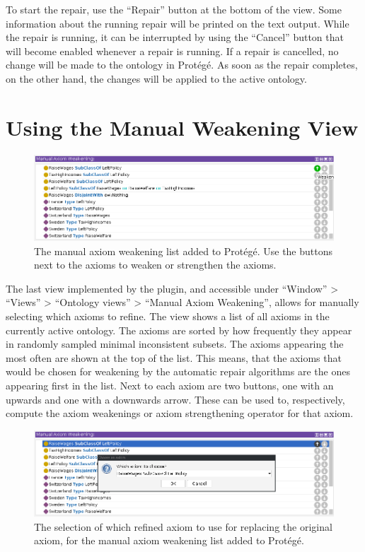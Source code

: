 To start the repair, use the ``Repair'' button at the bottom of the view. Some information about the running repair will be printed on the text output. While the repair is running, it can be interrupted by using the ``Cancel'' button that will become enabled whenever a repair is running. If a repair is cancelled, no change will be made to the ontology in Protégé. As soon as the repair completes, on the other hand, the changes will be applied to the active ontology.

\section{Using the Manual Weakening View}

\begin{figure}[htbp]
  \centering
  \includegraphics[width=\textwidth]{resources/protege-guide-list.png}
  \caption{The manual axiom weakening list added to Protégé. Use the buttons next to the axioms to weaken or strengthen the axioms.}
\end{figure}

The last view implemented by the plugin, and accessible under ``Window'' > ``Views'' > ``Ontology views'' > ``Manual Axiom Weakening'', allows for manually selecting which axioms to refine. The view shows a list of all axioms in the currently active ontology. The axioms are sorted by how frequently they appear in randomly sampled minimal inconsistent subsets. The axioms appearing the most often are shown at the top of the list. This means, that the axioms that would be chosen for weakening by the automatic repair algorithms are the ones appearing first in the list. Next to each axiom are two buttons, one with an upwards and one with a downwards arrow. These can be used to, respectively, compute the axiom weakenings or axiom strengthening operator for that axiom.

\begin{figure}[htbp]
  \centering
  \includegraphics[width=\textwidth]{resources/protege-guide-replace.png}
  \caption{The selection of which refined axiom to use for replacing the original axiom, for the manual axiom weakening list added to Protégé.}
\end{figure}

